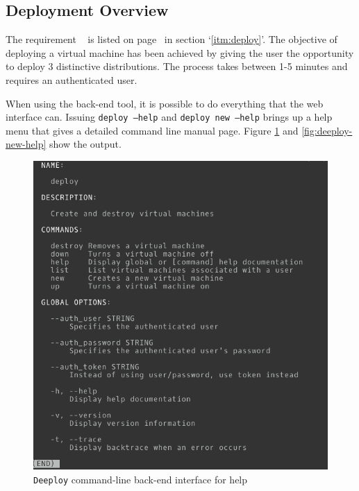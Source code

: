 \documentclass{article}
\begin{document}
\subsection{Deployment Overview}
The requirement ~  is listed on page~\pageref{itm:deploy} in section `\ref{itm:deploy}'.
The objective of deploying a virtual machine has been achieved by giving the user the opportunity to deploy 3 distinctive distributions. The process takes between 1-5 minutes and requires an authenticated user.

When using the back-end tool, it is possible to do everything that the web interface can. Issuing \texttt{deploy --help} and \texttt{deploy new --help} brings up a help menu that gives a detailed command line manual page. Figure \ref{fig:deeploy-help} and \ref{fig:deeploy-new-help} show the output.

\begin{figure}[h!]
	\vspace{0.5cm}
	\includegraphics[width=12cm]{deeploy_help_cli.png}
	\vspace{0.5cm}
	\caption{\texttt{Deeploy} command-line back-end interface for help}
	\label{fig:deeploy-help}
\end{figure}
\end{document}
